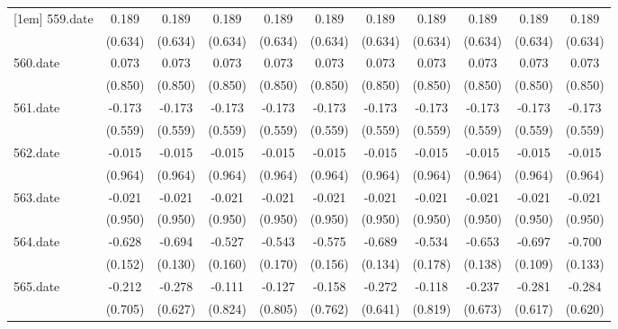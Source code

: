 \begin{tabular}{l*{10}{c}}
[1em]
559.date    &       0.189&       0.189&       0.189&       0.189&       0.189&       0.189&       0.189&       0.189&       0.189&       0.189\\
            &     (0.634)&     (0.634)&     (0.634)&     (0.634)&     (0.634)&     (0.634)&     (0.634)&     (0.634)&     (0.634)&     (0.634)\\
[1em]
560.date    &       0.073&       0.073&       0.073&       0.073&       0.073&       0.073&       0.073&       0.073&       0.073&       0.073\\
            &     (0.850)&     (0.850)&     (0.850)&     (0.850)&     (0.850)&     (0.850)&     (0.850)&     (0.850)&     (0.850)&     (0.850)\\
[1em]
561.date    &      -0.173&      -0.173&      -0.173&      -0.173&      -0.173&      -0.173&      -0.173&      -0.173&      -0.173&      -0.173\\
            &     (0.559)&     (0.559)&     (0.559)&     (0.559)&     (0.559)&     (0.559)&     (0.559)&     (0.559)&     (0.559)&     (0.559)\\
[1em]
562.date    &      -0.015&      -0.015&      -0.015&      -0.015&      -0.015&      -0.015&      -0.015&      -0.015&      -0.015&      -0.015\\
            &     (0.964)&     (0.964)&     (0.964)&     (0.964)&     (0.964)&     (0.964)&     (0.964)&     (0.964)&     (0.964)&     (0.964)\\
[1em]
563.date    &      -0.021&      -0.021&      -0.021&      -0.021&      -0.021&      -0.021&      -0.021&      -0.021&      -0.021&      -0.021\\
            &     (0.950)&     (0.950)&     (0.950)&     (0.950)&     (0.950)&     (0.950)&     (0.950)&     (0.950)&     (0.950)&     (0.950)\\
[1em]
564.date    &      -0.628&      -0.694&      -0.527&      -0.543&      -0.575&      -0.689&      -0.534&      -0.653&      -0.697&      -0.700\\
            &     (0.152)&     (0.130)&     (0.160)&     (0.170)&     (0.156)&     (0.134)&     (0.178)&     (0.138)&     (0.109)&     (0.133)\\
[1em]
565.date    &      -0.212&      -0.278&      -0.111&      -0.127&      -0.158&      -0.272&      -0.118&      -0.237&      -0.281&      -0.284\\
            &     (0.705)&     (0.627)&     (0.824)&     (0.805)&     (0.762)&     (0.641)&     (0.819)&     (0.673)&     (0.617)&     (0.620)\\

\end{tabular}
